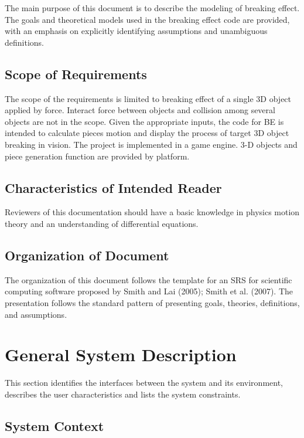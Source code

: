 \documentclass[12pt]{article}
\begin{document}
The main purpose of this document is to describe the modeling of breaking effect. The goals and theoretical models used in the breaking effect code are provided, with an emphasis on explicitly identifying assumptions and unambiguous definitions. 

\subsection{Scope of Requirements} 

The scope of the requirements is limited to breaking effect of a single 3D object applied by force. Interact force between objects and collision among several objects are not in the scope. Given the appropriate inputs, the code for BE is intended to calculate pieces motion and display the process of target 3D object breaking in vision. The project is implemented in a game engine. 3-D objects and piece generation function are provided by platform. 

\subsection{Characteristics of Intended Reader} 

Reviewers of this documentation should have a basic knowledge in physics motion theory and an understanding of differential equations.

\subsection{Organization of Document}

The organization of this document follows the template for an SRS for scientific computing software proposed by Smith and Lai (2005); Smith et al. (2007). The presentation follows the standard pattern of presenting goals, theories, definitions, and assumptions.

\section{General System Description}

This section identifies the interfaces between the system and its environment,
describes the user characteristics and lists the system constraints.

\subsection{System Context}
\end{document}
